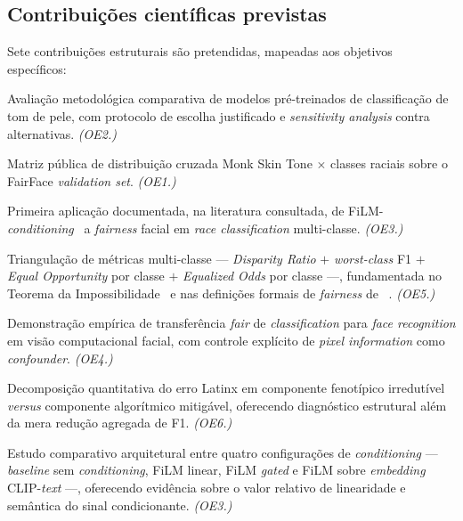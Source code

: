 \subsection{Contribuições científicas previstas}
\label{sec:contribuicoes}

Sete contribuições estruturais são pretendidas, mapeadas aos objetivos específicos:

\begin{description}[font=\bfseries\sffamily]
\item[C1.] Avaliação metodológica comparativa de modelos pré-treinados de classificação de tom de pele, com protocolo de escolha justificado e \emph{sensitivity analysis} contra alternativas. \textit{(OE2.)}
\item[C2.] Matriz pública de distribuição cruzada Monk Skin Tone $\times$ classes raciais sobre o FairFace \emph{validation set}. \textit{(OE1.)}
\item[C3.] Primeira aplicação documentada, na literatura consultada, de FiLM-\emph{conditioning}~\autocite{perez2018film} a \emph{fairness} facial em \emph{race classification} multi-classe. \textit{(OE3.)}
\item[C4.] Triangulação de métricas multi-classe --- \emph{Disparity Ratio} $+$ \emph{worst-class} F1 $+$ \emph{Equal Opportunity} por classe $+$ \emph{Equalized Odds} por classe ---, fundamentada no Teorema da Impossibilidade~\autocite{kleinberg2017inherent} e nas definições formais de \emph{fairness} de \citeauthor{hardt2016equality}~\autocite{hardt2016equality}. \textit{(OE5.)}
\item[C5.] Demonstração empírica de transferência \emph{fair} de \emph{classification} para \emph{face recognition} em visão computacional facial, com controle explícito de \emph{pixel information} como \emph{confounder}. \textit{(OE4.)}
\item[C6.] Decomposição quantitativa do erro Latinx em componente fenotípico irredutível \emph{versus} componente algorítmico mitigável, oferecendo diagnóstico estrutural além da mera redução agregada de F1. \textit{(OE6.)}
\item[C7.] Estudo comparativo arquitetural entre quatro configurações de \emph{conditioning} --- \emph{baseline} sem \emph{conditioning}, FiLM linear, FiLM \emph{gated} e FiLM sobre \emph{embedding} CLIP-\emph{text} ---, oferecendo evidência sobre o valor relativo de linearidade e semântica do sinal condicionante. \textit{(OE3.)}
\end{description}
